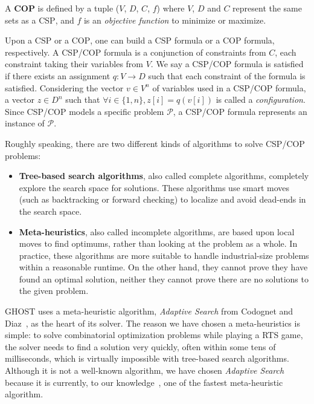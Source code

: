 \documentclass[journal]{IEEEtran}
\newcommand{\minormod}[1]{#1 \xspace}
\newcommand{\csp}{\textsc{CSP}\xspace}
\newcommand{\cop}{\textsc{COP}\xspace}
\newcommand{\ghost}{\textsc{GHOST}\xspace}
\begin{document}
A {\bf \cop} is defined by a tuple ($V$, $D$, $C$, $f$) where $V$, $D$ and
$C$ represent the same sets as a \csp, and $f$ is an {\it objective
function} to minimize  or maximize.

Upon a \csp or a \cop, one can build a \csp formula or a \cop formula,
respectively.   A \csp/\cop  formula is  a conjunction  of constraints
from $C$,  each constraint taking their  variables from $V$. We  say a
\csp/\cop formula  is satisfied  if there exists  an assignment  $q: V
\rightarrow  D$   such  that each   constraint  of  the   formula  is
satisfied. Considering the  vector $v \in V^n$ of variables  used in a
\csp/\cop formula, a vector $z \in D^n$ such that
$\forall i \in \{1,n\}, z[i] = q(v[i])$
is called a {\it configuration}.  Since
\csp/\cop models a specific problem $\mathcal{P}$, a \csp/\cop formula
represents an instance of $\mathcal{P}$.

Roughly speaking,  there are  two different  kinds of  algorithms to
solve \csp/\cop problems:
\begin{itemize}
\item \textbf{Tree-based  search algorithms}, also called complete 
algorithms, completely explore the search space for solutions.  
These algorithms use smart moves (such as backtracking or forward checking) 
to localize and avoid dead-ends in the search space.
\item \textbf{Meta-heuristics},  also called incomplete algorithms,  
  are based upon local moves to  find optimums, rather than looking at
  the problem as  a whole. In practice, these algorithms  are 
  \minormod{more suitable to handle}
  industrial-size  problems   within  a
  reasonable runtime. On  the other hand, they cannot  prove they have
  found an  optimal solution, neither  they cannot prove there  are no
  solutions to the given problem.
\end{itemize}

\ghost uses a meta-heuristic algorithm, \emph{Adaptive Search} from
Codognet and Diaz~\cite{Codognet01}, as the heart of its solver.  The
reason we have chosen a meta-heuristics is simple: to solve
combinatorial optimization problems while playing a RTS game, the
solver needs to find a solution very quickly, often within some tens of
milliseconds, which is virtually impossible with tree-based search
algorithms. Although it is not a well-known algorithm, we have chosen
{\it Adaptive Search} because it is currently, to our knowledge~\cite{Caniou14}, 
one of the fastest meta-heuristic algorithm.
\end{document}
